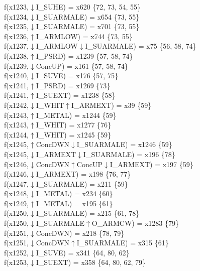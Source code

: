 f(x1233,$\downarrow$I\_SUHE) = x620 \{72, 73, 54, 55\} \\  
f(x1234,$\downarrow$I\_SUARMALE) = x654 \{73, 55\} \\  
f(x1235,$\downarrow$I\_SUARMALE) = x701 \{73, 55\} \\  
f(x1236,$\uparrow$I\_ARMLOW) = x744 \{73, 55\} \\  
f(x1237,$\downarrow$I\_ARMLOW$\downarrow$I\_SUARMALE) = x75 \{56, 58, 74\} \\  
f(x1238,$\uparrow$I\_PSRD) = x1239 \{57, 58, 74\} \\  
f(x1239,$\downarrow$ConcUP) = x161 \{57, 58, 74\} \\  
f(x1240,$\downarrow$I\_SUVE) = x176 \{57, 75\} \\  
f(x1241,$\uparrow$I\_PSRD) = x1269 \{73\} \\  
f(x1241,$\uparrow$I\_SUEXT) = x1238 \{58\} \\  
f(x1242,$\downarrow$I\_WHIT$\uparrow$I\_ARMEXT) = x39 \{59\} \\  
f(x1243,$\uparrow$I\_METAL) = x1244 \{59\} \\  
f(x1243,$\uparrow$I\_WHIT) = x1277 \{76\} \\  
f(x1244,$\uparrow$I\_WHIT) = x1245 \{59\} \\  
f(x1245,$\uparrow$ConcDWN$\downarrow$I\_SUARMALE) = x1246 \{59\} \\  
f(x1245,$\downarrow$I\_ARMEXT$\downarrow$I\_SUARMALE) = x196 \{78\} \\  
f(x1246,$\downarrow$ConcDWN$\uparrow$ConcUP$\downarrow$I\_ARMEXT) = x197 \{59\} \\  
f(x1246,$\downarrow$I\_ARMEXT) = x198 \{76, 77\} \\  
f(x1247,$\downarrow$I\_SUARMALE) = x211 \{59\} \\  
f(x1248,$\downarrow$I\_METAL) = x234 \{60\} \\  
f(x1249,$\uparrow$I\_METAL) = x195 \{61\} \\  
f(x1250,$\downarrow$I\_SUARMALE) = x215 \{61, 78\} \\  
f(x1250,$\downarrow$I\_SUARMALE$\uparrow$O\_ARMCW) = x1283 \{79\} \\  
f(x1251,$\downarrow$ConcDWN) = x218 \{78, 79\} \\  
f(x1251,$\downarrow$ConcDWN$\uparrow$I\_SUARMALE) = x315 \{61\} \\  
f(x1252,$\downarrow$I\_SUVE) = x341 \{64, 80, 62\} \\  
f(x1253,$\downarrow$I\_SUEXT) = x358 \{64, 80, 62, 79\} \\  
